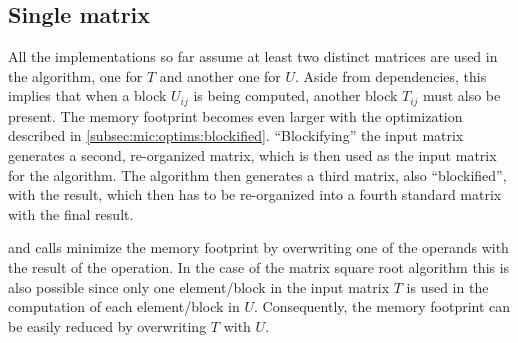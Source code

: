 \documentclass[../thesis]{subfiles}
\begin{document}
	\subsection{Single matrix}
	\label{subsec:mic:optims:self}
	All the implementations so far assume at least two distinct matrices are used in the algorithm, one for $T$ and another one for $U$. Aside from dependencies, this implies that when a block $U_{ij}$ is being computed, another block $T_{ij}$ must also be present. The memory footprint becomes even larger with the optimization described in \cref{subsec:mic:optims:blockified}. ``Blockifying'' the input matrix generates a second, re-organized matrix, which is then used as the input matrix for the algorithm. The algorithm then generates a third matrix, also ``blockified'', with the result, which then has to be re-organized into a fourth standard matrix with the final result.

	\blas and \lapack calls minimize the memory footprint by overwriting one of the operands with the result of the operation. In the case of the matrix square root algorithm this is also possible since only one element/block in the input matrix $T$ is used in the computation of each element/block in $U$. Consequently, the memory footprint can be easily reduced by overwriting $T$ with $U$.
\end{document}
